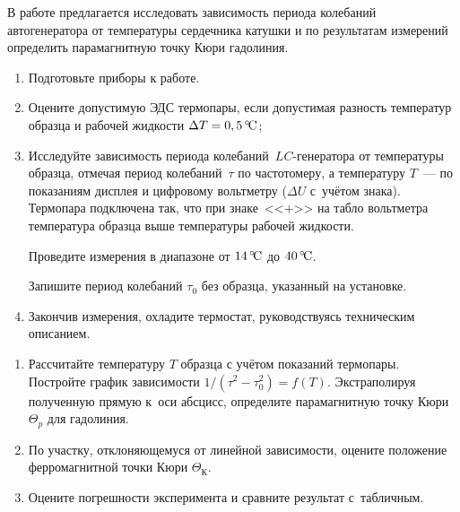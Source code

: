 \begin{lab:task}

В работе предлагается исследовать зависимость периода колебаний
автогенератора от температуры сердечника катушки и по результатам измерений
определить парамагнитную точку Кюри гадолиния.

	\begin{enumerate}
		\item Подготовьте приборы к работе.

		\item Оцените допустимую ЭДС термопары, если допустимая разность
температур образца и рабочей жидкости $\Delta T=0,5\,^\circ\!\mathrm{C}$;

		\item Исследуйте зависимость периода колебаний~$LC$-генератора от
температуры образца, отмечая период колебаний~$\tau$
		по частотомеру, а температуру $T$~--- по показаниям дисплея и цифровому
вольтметру ($\Delta U$ с~учётом знака). Термопара
		подключена так, что при знаке~<<+>> на табло вольтметра температура
образца выше температуры рабочей жидкости.

		Проведите измерения в диапазоне от $14\,^\circ\!\mathrm{C}$ до $40\,^\circ\!\mathrm{C}$.

		Запишите период колебаний $\tau_0$ без образца, указанный на установке.

		\item Закончив измерения, охладите термостат, руководствуясь техническим
описанием.

	\end{enumerate}

	\begin{enumerate}

		\item Рассчитайте температуру $T$ образца с учётом показаний термопары.
Постройте график зависимости $1/(\tau^2-\tau_0^2)=f(T)$.
		Экстраполируя полученную прямую к~оси абсцисс, определите парамагнитную
точку Кюри~$\Theta_p$ для гадолиния.

        \item По участку, отклоняющемуся от линейной зависимости, оцените
        положение ферромагнитной точки Кюри $\Theta_К$.
		\item Оцените погрешности эксперимента и сравните результат с~табличным.

	\end{enumerate}

\end{lab:task}


